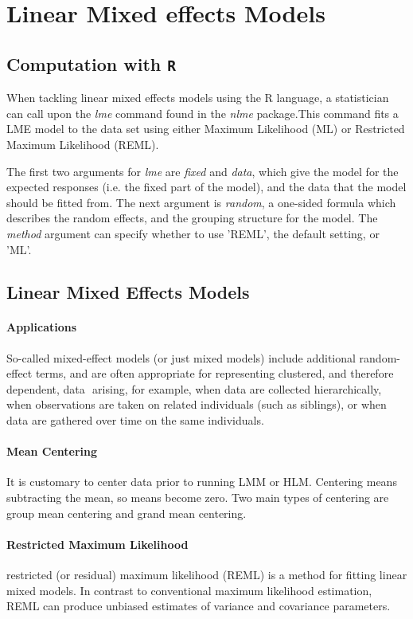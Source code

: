 \documentclass[12pt, a4paper]{report}
\theoremstyle{plain}
\theoremstyle{definition}
\theoremstyle{remark}
\begin{document}
\chapter{Linear Mixed effects Models}







\section{Computation with \texttt{R}} When tackling linear mixed effects models
using the R language, a statistician can call upon the \emph{lme}
command found in the \emph{nlme} package.This command fits a LME
model to the data set using either Maximum Likelihood (ML) or
Restricted Maximum Likelihood (REML).

The first two arguments for \emph{lme} are \emph{fixed} and
\emph{data}, which give the model for the expected responses (i.e.
the fixed part of the model), and the data that the model should
be fitted from. The next argument is  \emph{random}, a one-sided
formula which describes the random effects, and the grouping
structure for the model. The  \emph{method} argument can specify
whether to use 'REML', the default setting, or 'ML'.




\section{Linear Mixed Effects Models}
\subsubsection{Applications}
So-called mixed-effect models (or just mixed models) include
additional random-effect terms, and are often appropriate for
representing clustered, and therefore dependent, data  arising,
for example, when data are collected hierarchically, when
observations are taken on related individuals (such as siblings),
or when data are gathered over time on the same individuals.
\subsubsection{Mean Centering}
It is customary to center data prior to running LMM or HLM.
Centering means subtracting the mean, so means become zero. Two
main types of centering are group mean centering and grand mean
centering.
\subsubsection{Restricted Maximum Likelihood}
restricted (or residual) maximum likelihood (REML) is a method for
fitting linear mixed models. In contrast to conventional maximum
likelihood estimation, REML can produce unbiased estimates of
variance and covariance parameters.
\end{document}
